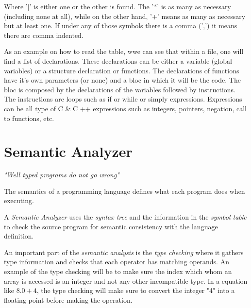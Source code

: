 \documentclass[conference]{IEEEtran}
\begin{document}
\begin{table}[H]
\begin{center}
	\end{center}
	\caption{Grammar} \label{tab_grammar}
\end{table}

Where '$|$' is either one or the other is found. The '*' is as many as necessary (including none at all), while on the other hand, '+' means as many as necessary but at least one. If under any of those symbols there is a comma (',') it means there are comma indented.

As an example on how to read the table, wwe can see that within a file, one will find a list of declarations. These declarations can be either a variable  (global variables) or a structure declaration or functions. The declarations of functions have it's own parameters (or none) and a bloc in which it will be the code.
The bloc is composed by the declarations of the variables followed by instructions. The instructions are loops such as if or while or simply expressions. Expressions can be all type of C \& C ++ expressions such as integers, pointers, negation, call to functions, etc.   

\section{Semantic Analyzer} \label{sec:semantic-analyzer}
\textit{"Well typed programs do not go wrong"}

The semantics of a programming language defines what each program does when executing.

A \textit{Semantic Analyzer} uses the \textit{syntax tree} and the information in the \textit{symbol table} to check the source program for semantic consistency with the language definition. 

An important part of the \textit{semantic analysis} is the \textit{type checking} where it gathers type information and checks that each operator has matching operands.
An example of the type checking will be to make sure the index which whom an array is accessed is an integer and not any other incompatible type.
In a equation like \(8.0 + 4\), the type checking will make sure to convert the integer "4" into a floating point before making the operation. 
\end{document}
